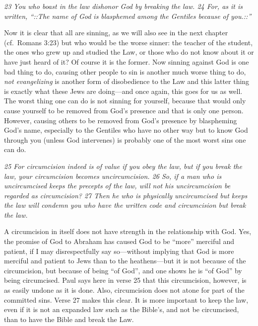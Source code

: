 \emph{23 You who boast in the law dishonor God by breaking the law. 24
For, as it is written, ``::The name of God is blasphemed among the
Gentiles because of you.::''}

Now it is clear that all are sinning, as we will also see in the next
chapter (cf.~Romans 3:23) but who would be the worse sinner: the teacher
of the student, the ones who grew up and studied the Law, or those who
do not know about it or have just heard of it? Of course it is the
former. Now sinning against God is one bad thing to do, causing other
people to sin is another much worse thing to do, \emph{not evangelizing}
is another form of disobedience to the Law and this latter thing is
exactly what these Jews are doing---and once again, this goes for us as
well. The worst thing one can do is not sinning for yourself, because
that would only cause yourself to be removed from God's presence and
that is only one person. However, causing others to be removed from
God's presence by blaspheming God's name, especially to the Gentiles who
have no other way but to know God through you (unless God intervenes) is
probably one of the most worst sins one can do.

\emph{25 For circumcision indeed is of value if you obey the law, but if
you break the law, your circumcision becomes uncircumcision. 26 So, if a
man who is uncircumcised keeps the precepts of the law, will not his
uncircumcision be regarded as circumcision? 27 Then he who is physically
uncircumcised but keeps the law will condemn you who have the written
code and circumcision but break the law.}

A circumcision in itself does not have strength in the relationship with
God. Yes, the promise of God to Abraham has caused God to be ``more''
merciful and patient, if I may disrespectfully say so---without implying
that God is more merciful and patient to Jews than to the heathens---but
it is not because of the circumcision, but because of being ``of God'',
and one shows he is ``of God'' by being circumcised. Paul says here in
verse 25 that this circumcision, however, is as easily undone as it is
done. Also, circumcision does not atone for part of the committed sins.
Verse 27 makes this clear. It is more important to keep the law, even if
it is not an expanded law such as the Bible's, and not be circumcised,
than to have the Bible and break the Law.

